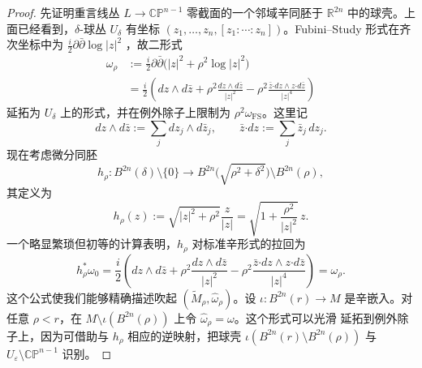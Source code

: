 \begin{proof}
先证明重言线丛 $L\to\mathbb{CP}^{n-1}$ 零截面的一个邻域辛同胚于
$\mathbb R^{2n}$ 中的球壳。上面已经看到，$\delta$-球丛 $U_\delta$ 有坐标
$(z_1,\ldots,z_n,[z_1:\cdots:z_n])$。Fubini--Study 形式在齐次坐标中为
$\frac{i}{2}\partial\bar\partial\log|z|^2$
，故二形式
\[
\begin{split}
  \omega_\rho
  &:=\frac{i}{2}\partial\bar\partial
       \bigl(|z|^2+\rho^2\log|z|^2\bigr)\\
  &=\frac{i}{2}\left(
      dz\wedge d\bar z
      +\rho^2\frac{dz\wedge d\bar z}{|z|^2}
      -\rho^2\frac{\bar z\mathbin{\boldsymbol\cdot}dz\wedge
                         z\mathbin{\boldsymbol\cdot}d\bar z}{|z|^4}
    \right)
\end{split}
\]
延拓为 $U_\delta$ 上的形式，并在例外除子上限制为
$\rho^2\omega_{\mathrm{FS}}$。这里记
\[
  dz\wedge d\bar z:=\sum_jdz_j\wedge d\bar z_j,
  \qquad
  \bar z\mathbin{\boldsymbol\cdot}dz:=\sum_j\bar z_j\,dz_j.
\]
现在考虑微分同胚
\[
  h_\rho:B^{2n}(\delta)\setminus\{0\}
  \longrightarrow B^{2n}\bigl(\sqrt{\rho^2+\delta^2}\bigr)
                   \setminus B^{2n}(\rho),
\]
其定义为
\[
  h_\rho(z):=\sqrt{|z|^2+\rho^2}\frac{z}{|z|}
  =\sqrt{1+\frac{\rho^2}{|z|^2}}\,z.
\]
一个略显繁琐但初等的计算表明，$h_\rho$ 对标准辛形式的拉回为
\[
  h_\rho^*\omega_0
  =\frac{i}{2}\left(
      dz\wedge d\bar z
      +\rho^2\frac{dz\wedge d\bar z}{|z|^2}
      -\rho^2\frac{\bar z\mathbin{\boldsymbol\cdot}dz\wedge
                         z\mathbin{\boldsymbol\cdot}d\bar z}{|z|^4}
    \right)
  =\omega_\rho.
\]
这个公式使我们能够精确描述吹起
$(\widetilde M_\rho,\widehat\omega_\rho)$。设
$\iota:B^{2n}(r)\to M$ 是辛嵌入。对任意 $\rho<r$，在
$M\setminus\iota(B^{2n}(\rho))$ 上令 $\widehat\omega_\rho=\omega$。这个形式可以光滑
延拓到例外除子上，因为可借助与 $h_\rho$ 相应的逆映射，把球壳
$\iota(B^{2n}(r)\setminus B^{2n}(\rho))$ 与
$U_\varepsilon\setminus\mathbb{CP}^{n-1}$ 识别。


\end{proof}
